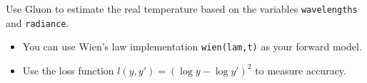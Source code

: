 \documentclass[11pt]{article}
\providecommand{\tightlist}{%
      \setlength{\itemsep}{0pt}\setlength{\parskip}{0pt}}
\begin{document}
    Use Gluon to estimate the real temperature based on the variables
\texttt{wavelengths} and \texttt{radiance}.

\begin{itemize}
\tightlist
\item
  You can use Wien's law implementation \texttt{wien(lam,t)} as your
  forward model.
\item
  Use the loss function \(l(y,y') = (\log y - \log y')^2\) to measure
  accuracy.
\end{itemize}


    
    
    
    
\end{document}
